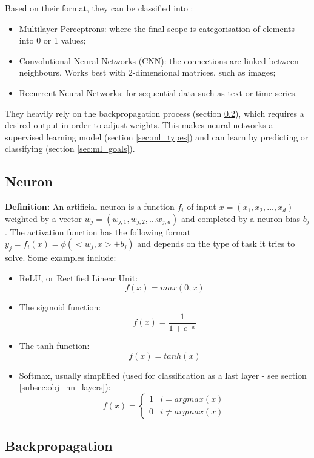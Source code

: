 Based on their format, they can be classified into \cite{toulouse-nn}:

\begin{itemize}
\item{Multilayer Perceptrons: where the final scope is categorisation of elements into 0 or 1 values;}
\item{Convolutional Neural Networks (CNN): the connections are linked between neighbours. Works best with 2-dimensional matrices, such as images;}
\item{Recurrent Neural Networks: for sequential data such as text or time series.}
\end{itemize}

They heavily rely on the backpropagation process (section \ref{subsec:obj_nn_backpropagation}), which requires a desired output in order to adjust weights. This makes neural networks a supervised learning model (section \ref{sec:ml_types}) and can learn by predicting or classifying (section \ref{sec:ml_goals}).

\subsection{Neuron}
\label{subsec:obj_nn_neuron}

\textbf{Definition:} An artificial neuron is a function $f_i$ of input $x = (x_1, x_2, ... , x_d)$ weighted by a vector $w_j = (w_{j,1}, w_{j,2}, ... w_{j,d})$ and completed by a neuron bias $b_j$. The activation function has the following format $y_j = f_i(x) = \phi(< w_j, x > + b_j)$ \cite{backpropagation} and depends on the type of task it tries to solve. Some examples include:

\begin{itemize}
\item{ReLU, or Rectified Linear Unit: \[ f(x) = max(0, x) \]}
\item{The sigmoid function: \[ f(x) = \frac{1}{1 + e^{-x}} \]} 
\item{The tanh function: \[ f(x) = tanh(x) \]}
\item{Softmax, usually simplified (used for classification as a last layer - see section \ref{subsec:obj_nn_layers}): 
\[ f(x) = 
	\begin{cases} 
		1 & i = argmax(x) \\
		0 & i \neq argmax(x)
	\end{cases}
\]}
\end{itemize}

\subsection{Backpropagation}
\label{subsec:obj_nn_backpropagation}

